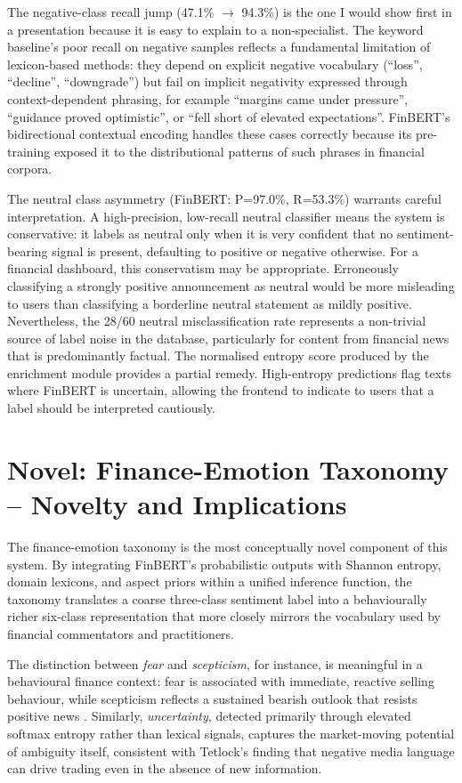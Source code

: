 The negative-class recall jump (47.1\% $\to$ 94.3\%) is the one I would show first in a presentation because it is easy to explain to a non-specialist.  The keyword baseline's poor recall on negative samples reflects a fundamental limitation of lexicon-based methods: they depend on explicit negative vocabulary (``loss'', ``decline'', ``downgrade'') but fail on implicit negativity expressed through context-dependent phrasing, for example ``margins came under pressure'', ``guidance proved optimistic'', or ``fell short of elevated expectations''.  FinBERT's bidirectional contextual encoding handles these cases correctly because its pre-training exposed it to the distributional patterns of such phrases in financial corpora.

The neutral class asymmetry (FinBERT: P=97.0\%, R=53.3\%) warrants careful interpretation.  A high-precision, low-recall neutral classifier means the system is conservative: it labels as neutral only when it is very confident that no sentiment-bearing signal is present, defaulting to positive or negative otherwise.  For a financial dashboard, this conservatism may be appropriate. Erroneously classifying a strongly positive announcement as neutral would be more misleading to users than classifying a borderline neutral statement as mildly positive.  Nevertheless, the 28/60 neutral misclassification rate represents a non-trivial source of label noise in the database, particularly for content from financial news that is predominantly factual.  The normalised entropy score produced by the enrichment module provides a partial remedy. High-entropy predictions flag texts where FinBERT is uncertain, allowing the frontend to indicate to users that a label should be interpreted cautiously.

\section{Novel: Finance-Emotion Taxonomy -- Novelty and Implications}

The finance-emotion taxonomy is the most conceptually novel component of this system.  By integrating FinBERT's probabilistic outputs with Shannon entropy, domain lexicons, and aspect priors within a unified inference function, the taxonomy translates a coarse three-class sentiment label into a behaviourally richer six-class representation that more closely mirrors the vocabulary used by financial commentators and practitioners.

The distinction between \textit{fear} and \textit{scepticism}, for instance, is meaningful in a behavioural finance context: fear is associated with immediate, reactive selling behaviour, while scepticism reflects a sustained bearish outlook that resists positive news \citep{bollen2011twitter}.  Similarly, \textit{uncertainty}, detected primarily through elevated softmax entropy rather than lexical signals, captures the market-moving potential of ambiguity itself, consistent with Tetlock's \citeyear{tetlock2007giving} finding that negative media language can drive trading even in the absence of new information.

